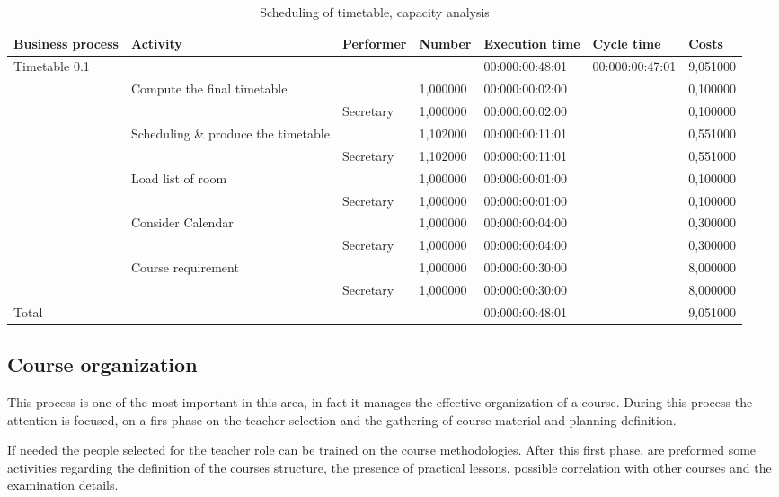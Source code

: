 \begin{landscape}
\centering
\begin{table}
{\tiny
\begin{tabular}{|l|l|l|l|l|l|l|}
Business process&Activity&Performer&Number&Execution time&Cycle
time&Costs\\
\hline
Timetable 0.1&&&&00:000:00:48:01&00:000:00:47:01&9,051000\\
\hline
&Compute the final timetable &&1,000000&00:000:00:02:00&&0,100000\\
\hline
&&Secretary &1,000000&00:000:00:02:00&&0,100000\\
\hline
&Scheduling \& produce the timetable &&1,102000&00:000:00:11:01&&0,551000\\
\hline
&&Secretary &1,102000&00:000:00:11:01&&0,551000\\
\hline
&Load list of room &&1,000000&00:000:00:01:00&&0,100000\\
\hline
&&Secretary &1,000000&00:000:00:01:00&&0,100000\\
\hline
&Consider Calendar &&1,000000&00:000:00:04:00&&0,300000\\
\hline
&&Secretary &1,000000&00:000:00:04:00&&0,300000\\
\hline
&Course requirement &&1,000000&00:000:00:30:00&&8,000000\\
\hline
&&Secretary &1,000000&00:000:00:30:00&&8,000000\\
\hline
Total&&&&00:000:00:48:01&&9,051000\\
\hline
\end{tabular}
}
\caption{Scheduling of timetable, capacity analysis} 
\label{2tab:timetab}
\end{table}
\end{landscape}





\subsection{Course organization}
This process is one of the most important in this area, in fact it manages
the effective organization of a course. During this process the attention
is focused, on a firs phase on the teacher selection and the gathering of
course material and planning definition.

If needed the people selected for the teacher role can be trained on the
course methodologies. After this first phase, are preformed  some
activities regarding the definition of the courses structure, the presence
of practical lessons, possible correlation with other courses and the
examination details.

